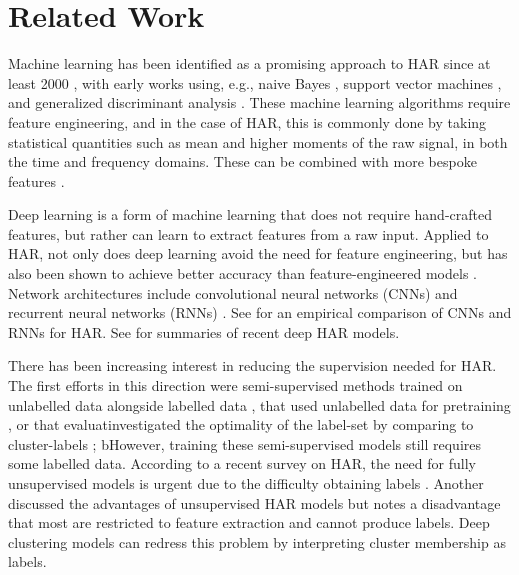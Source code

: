 \documentclass[wcp]{jmlr}
\begin{document}
\section{Related Work} \label{sec:related-work}

Machine learning has been identified as a promising approach to HAR since at least 2000 \citep{hongeng2000representation}, with early works using, e.g., naive Bayes \citep{tapia2004activity}, 
support vector machines \citep{he2009activity}, and generalized discriminant analysis \citep{khan2010human}. These machine learning algorithms require feature engineering, and in the case of HAR, this is commonly done by taking statistical quantities such as mean and higher moments of the raw signal, in both the time and frequency domains. These can be combined with more bespoke features \citep{zhang2011feature,he2009activity}.



Deep learning is a form of machine learning that does not require hand-crafted features, but rather can learn to extract features from a raw input.
Applied to HAR, not only does deep learning avoid the need for feature engineering, but has also been shown to achieve better accuracy than feature-engineered models \citep{alsheikh2016deep,ferrari2019hand}. Network architectures include convolutional neural networks (CNNs)
\citep{yang2015deep,chen2015deep,jiang2015human,ronao2015deep} and recurrent neural networks (RNNs) 
\citep{inoue2018deep,singh2017human}. See \citep{hammerla2016deep} for an empirical comparison of CNNs and RNNs for HAR. See \citep{chen2021deep,wang2019deep} for summaries of recent deep HAR models. 

There has been increasing interest in reducing the supervision needed for HAR. The first efforts in this direction were semi-supervised methods trained on unlabelled data alongside labelled data \citep{li2011incorporating}, that used unlabelled data for pretraining \citep{li2014unsupervised,alsheikh2016deep}, or that evaluatinvestigated the optimality of the label-set by comparing to cluster-labels \citep{mejia2017evaluate}; bHowever, training these semi-supervised models still requires some labelled data.
According to a recent survey on HAR, the need for fully unsupervised models is urgent due to the difficulty obtaining labels \citep{wang2019deep}. Another \citep{chen2021deep} discussed the advantages of unsupervised HAR models but notes a disadvantage that most are restricted to feature extraction and cannot produce labels. Deep clustering models can redress this problem by interpreting cluster membership as labels. 
\end{document}
